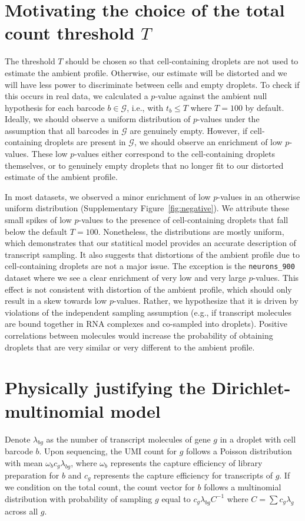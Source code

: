 \documentclass{article}
\newcommand{\code}[1]{\texttt{#1}}
\begin{document}
\section{Motivating the choice of the total count threshold $T$}
The threshold $T$ should be chosen so that cell-containing droplets are not used to estimate the ambient profile.
Otherwise, our estimate will be distorted and we will have less power to discriminate between cells and empty droplets.
To check if this occurs in real data, we calculated a $p$-value against the ambient null hypothesis for each barcode $b \in \mathcal{G}$, 
i.e., with $t_b \le T$ where $T = 100$ by default.
Ideally, we should observe a uniform distribution of $p$-values under the assumption that all barcodes in $\mathcal{G}$ are genuinely empty.
However, if cell-containing droplets are present in $\mathcal{G}$, we should observe an enrichment of low $p$-values.
These low $p$-values either correspond to the cell-containing droplets themselves,
or to genuinely empty droplets that no longer fit to our distorted estimate of the ambient profile.

In most datasets, we observed a minor enrichment of low $p$-values in an otherwise uniform distribution (Supplementary Figure~\ref{fig:negative}). 
We attribute these small spikes of low $p$-values to the presence of cell-containing droplets that fall below the default $T=100$.
Nonetheless, the distributions are mostly uniform, which demonstrates that our statitical model provides an accurate description of transcript sampling.
It also suggests that distortions of the ambient profile due to cell-containing droplets are not a major issue.
The exception is the \code{neurons\_900} dataset where we see a clear enrichment of very low and very large $p$-values.
This effect is not consistent with distortion of the ambient profile, which should only result in a skew towards low $p$-values.
Rather, we hypothesize that it is driven by violations of the independent sampling assumption (e.g., if transcript molecules are bound together in RNA complexes and co-sampled into droplets).
Positive correlations between molecules would increase the probability of obtaining droplets that are very similar or very different to the ambient profile.

\section{Physically justifying the Dirichlet-multinomial model}
Denote $\lambda_{bg}$ as the number of transcript molecules of gene $g$ in a droplet with cell barcode $b$.
Upon sequencing, the UMI count for $g$ follows a Poisson distribution \cite{marioni2008rnaseq} with mean $\omega_bc_g\lambda_{bg}$,
where $\omega_b$ represents the capture efficiency of library preparation for $b$ and $c_g$ represents the capture efficiency for transcripts of $g$.
If we condition on the total count, the count vector for $b$ follows a multinomial distribution with probability of sampling $g$ equal to $c_g\lambda_{bg}C^{-1}$
where $C = \sum c_g\lambda_g$ across all $g$.
\end{document}

